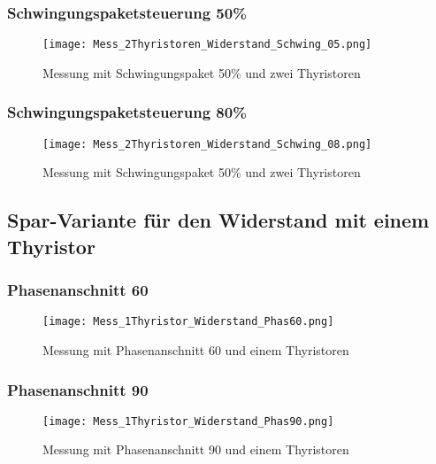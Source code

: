 \begin{appendix}
\newpage
\subsubsection*{Schwingungspaketsteuerung 50\%}

\begin{figure}[ht!]
	\centering
	\texttt{[image: Mess\_2Thyristoren\_Widerstand\_Schwing\_05.png]}	
	\caption{Messung mit Schwingungspaket 50\% und zwei Thyristoren}\label{fig:Mess_2Thyristoren_Schwing_50}
\end{figure}

\newpage
\subsubsection*{Schwingungspaketsteuerung 80\%}

\begin{figure}[ht!]
	\centering
	\texttt{[image: Mess\_2Thyristoren\_Widerstand\_Schwing\_08.png]}	
	\caption{Messung mit Schwingungspaket 50\% und zwei Thyristoren}\label{fig:Mess_2Thyristoren_Schwing_80}	
\end{figure}


\newpage
\subsection{Spar-Variante für den Widerstand mit einem Thyristor}
\subsubsection*{Phasenanschnitt 60\textdegree}

\begin{figure}[ht]
	\centering
	\texttt{[image: Mess\_1Thyristor\_Widerstand\_Phas60.png]}	
	\caption{Messung mit Phasenanschnitt 60\textdegree \hspace{0.02cm} und einem Thyristoren}\label{fig:Mess_1Thyristor_Phas_60grad}
\end{figure}

\newpage
\subsubsection*{Phasenanschnitt 90\textdegree}

\begin{figure}[ht]
	\centering
	\texttt{[image: Mess\_1Thyristor\_Widerstand\_Phas90.png]}	
	\caption{Messung mit Phasenanschnitt 90\textdegree \hspace{0.02cm} und einem Thyristoren}\label{fig:Mess_1Thyristor_Phas_90grad}
\end{figure}


\end{appendix}
